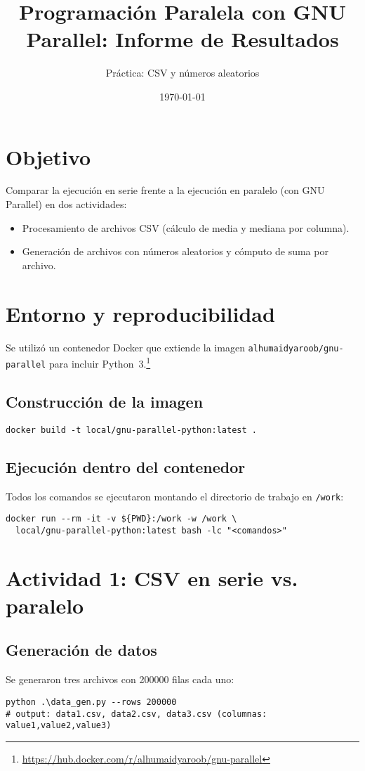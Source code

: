 \documentclass[11pt,a4paper]{article}
\title{Programación Paralela con GNU Parallel: Informe de Resultados}
\author{Práctica: CSV y números aleatorios}
\date{\today}
\newcommand{\code}[1]{\texttt{#1}}
\begin{document}
\maketitle

\section{Objetivo}
Comparar la ejecución en serie frente a la ejecución en paralelo (con GNU Parallel) en dos actividades:
\begin{itemize}
  \item Procesamiento de archivos CSV (cálculo de media y mediana por columna).
  \item Generación de archivos con números aleatorios y cómputo de suma por archivo.
\end{itemize}

\section{Entorno y reproducibilidad}
Se utilizó un contenedor Docker que extiende la imagen \code{alhumaidyaroob/gnu-parallel} para incluir Python~3.\footnote{\url{https://hub.docker.com/r/alhumaidyaroob/gnu-parallel}}

\subsection*{Construcción de la imagen}
\begin{lstlisting}[style=cmd]
docker build -t local/gnu-parallel-python:latest .
\end{lstlisting}

\subsection*{Ejecución dentro del contenedor}
Todos los comandos se ejecutaron montando el directorio de trabajo en \code{/work}:
\begin{lstlisting}[style=cmd]
docker run --rm -it -v ${PWD}:/work -w /work \
  local/gnu-parallel-python:latest bash -lc "<comandos>"
\end{lstlisting}

\section{Actividad 1: CSV en serie vs. paralelo}
\subsection{Generación de datos}
Se generaron tres archivos con \SI{200000}{} filas cada uno:
\begin{lstlisting}[style=cmd]
python .\data_gen.py --rows 200000
# output: data1.csv, data2.csv, data3.csv (columnas: value1,value2,value3)
\end{lstlisting}
\end{document}
